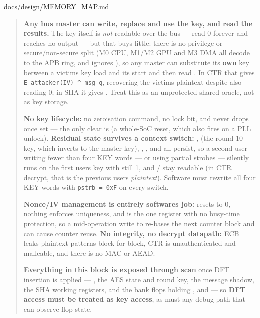 \begin{relocated}{docs/design/MEMORY_MAP.md}
\begin{quote}
\textbf{Any bus master can write, replace and use the key, and read the
results.} The key itself is \emph{not} readable over the bus ---
 read 0 forever and  reaches no output --- but
that buys little: there is no privilege or
secure/\allowbreak{}non-secure split (M0 CPU, M1/M2 GPU and M3 DMA all
decode to the APB ring, and  ignores ),
so any master can substitute its \textbf{own} key between a
victim\textquotesingle s key load and its start and then read
. In CTR that gives
\texttt{E\_\allowbreak{}attacker(IV)\ \textasciicircum{}\ msg\_\allowbreak{}q},
recovering the victim\textquotesingle s plaintext despite 
also reading 0; in SHA it gives . Treat this as an
unprotected shared oracle, not as key storage.

\textbf{No key lifecycle:} no zeroisation command, no lock bit, and
 never drops once set --- the only clear is
 (a whole-SoC reset, which also fires on a PLL unlock).
\textbf{Residual state survives a context switch:} ,
 (the round-10 key, which inverts to the master key),
, ,  and  all persist, so a
second user writing fewer than four KEY words --- or using partial
strobes --- silently runs on the first user\textquotesingle s key with
 still 1, and / stay readable
(in CTR decrypt, that is the previous user\textquotesingle s
\emph{plaintext}). Software must rewrite all four KEY words with
\texttt{pstrb\ =\allowbreak{}\ 0xF} on every switch.

\textbf{Nonce/IV management is entirely software\textquotesingle s job:}
 resets to 0, nothing enforces uniqueness, and  is the
one register with no busy-time protection, so a mid-operation write to
 re-bases the next counter block and can cause counter reuse.
\textbf{No integrity, no decrypt datapath:} ECB leaks plaintext patterns
block-for-block, CTR is unauthenticated and malleable, and there is no
MAC or AEAD.

\textbf{Everything in this block is exposed through scan} once DFT
insertion is applied --- , the AES state and round key, the
message shadow, the SHA working registers, and the bank flops holding
,  and  --- so \textbf{DFT access must
be treated as key access}, as must any debug path that can observe flop
state.
\end{quote}


\end{relocated}
